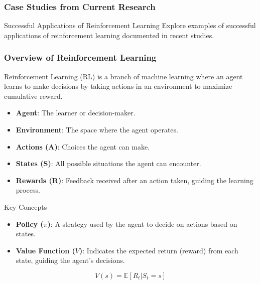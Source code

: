 \documentclass[aspectratio=169]{beamer}
\begin{document}
\begin{frame}
  \frametitle{Case Studies from Current Research}
  \begin{block}{Successful Applications of Reinforcement Learning}
    Explore examples of successful applications of reinforcement learning documented in recent studies.
  \end{block}
\end{frame}

\begin{frame}
  \frametitle{Overview of Reinforcement Learning}
  Reinforcement Learning (RL) is a branch of machine learning where an agent learns to make decisions by taking actions in an environment to maximize cumulative reward. 

  \begin{itemize}
    \item \textbf{Agent}: The learner or decision-maker.
    \item \textbf{Environment}: The space where the agent operates.
    \item \textbf{Actions (A)}: Choices the agent can make.
    \item \textbf{States (S)}: All possible situations the agent can encounter.
    \item \textbf{Rewards (R)}: Feedback received after an action taken, guiding the learning process.
  \end{itemize}
  
  \begin{block}{Key Concepts}
    \begin{itemize}
      \item \textbf{Policy ($\pi$)}: A strategy used by the agent to decide on actions based on states.
      \item \textbf{Value Function ($V$)}: Indicates the expected return (reward) from each state, guiding the agent's decisions.
    \end{itemize}
  \end{block}

  \begin{equation}
  V(s) = \mathbb{E}[R_t | S_t = s]
  \end{equation}
\end{frame}
\end{document}

